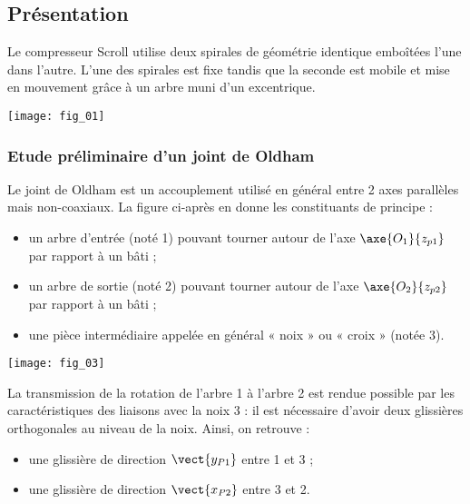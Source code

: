 \ifprof
\begin{multicols}{2}
\else
\begin{multicols}{2}
\fi

\subsection*{Présentation}
Le compresseur Scroll utilise deux spirales de géométrie identique emboîtées l’une dans 
l’autre. L’une des spirales est fixe tandis que la seconde est mobile et mise 
en mouvement grâce à un arbre muni d’un excentrique. 

\begin{center}%
\texttt{[image: fig\_01]}
\end{center}


\subsubsection*{Etude préliminaire d'un joint de Oldham}


Le joint de Oldham est un accouplement utilisé en général entre 2 axes parallèles mais non-coaxiaux. La figure ci-après en donne les constituants de principe :
\begin{itemize}
\item un arbre d’entrée (noté 1) pouvant tourner autour de l’axe $\axe{O_1}{z_{p1}}$ par rapport à un bâti ;
\item un arbre de sortie (noté 2) pouvant tourner autour de l’axe $\axe{O_2}{z_{p2}}$ par rapport à un bâti ;
\item une pièce intermédiaire appelée en général « noix » ou « croix » (notée 3).
\end{itemize}

\begin{center}%
\texttt{[image: fig\_03]}
\end{center}

La transmission de la rotation de l’arbre 1 à l’arbre 2 est rendue possible par les caractéristiques des liaisons avec la noix 3 : il est nécessaire d’avoir deux glissières orthogonales au niveau de la noix. Ainsi, on retrouve :
\begin{itemize}
\item une glissière de direction $\vect{y_{P1}}$ entre 1 et 3 ;
\item une glissière de direction $\vect{x_{P2}}$ entre 3 et 2.
\end{itemize}


\end{multicols}
\end{multicols}
